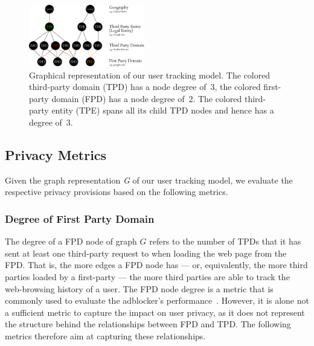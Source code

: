 \documentclass[compsoc, conference, letterpaper, 10pt, times]{IEEEtran}
\begin{document}
\begin{figure}[tb!]
  \centering 
  \includegraphics[width=0.45\textwidth]{figures/graph.eps}
  \caption{Graphical representation of our user tracking model. The colored third-party domain (TPD) has a node degree of~3, the colored first-party domain (FPD) has a node degree of~2. The colored third-party entity (TPE) spans all its child TPD nodes and hence has a degree of~3.}
  \label{fig:graph}
\end{figure}



\subsection{Privacy Metrics}

Given the graph representation \emph{G} of our user tracking model, we evaluate the respective privacy provisions based on the following metrics.



\subsubsection{Degree of First Party Domain}
The degree of a FPD node of graph $G$ refers to the number of TPDs that it has sent at least one third-party request to when loading the web page from the FPD. That is, the more edges a FPD node has --- or, equivalently, the more third parties loaded by a first-party --- the more third parties are able to track the web-browsing history of a user. The FPD node degree is a metric that is commonly used to evaluate the adblocker's performance~\cite{ruffel2015}. However, it is alone not a sufficient metric to capture the impact on user privacy, as it does not represent the structure behind the relationships between FPD and TPD. The following metrics therefore aim at capturing these relationships. 
\end{document}
